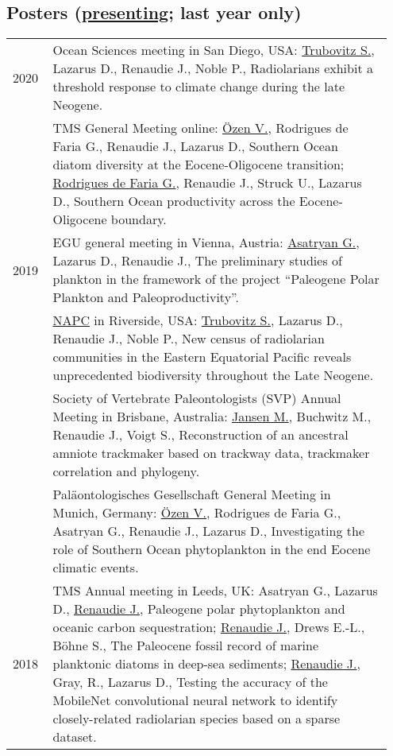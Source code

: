 \documentclass[11pt, a4paper]{article}
\begin{document}
\subsection[Posters]{Posters \textnormal{\footnotesize{(\underline{presenting}; last year only)}}}
\begin{longtable}{@{}p{0.1\linewidth} P{0.85\linewidth}@{}}
2020 & Ocean Sciences meeting in San Diego, USA: \underline{Trubovitz S.}, Lazarus D., Renaudie J., Noble P., Radiolarians exhibit a threshold response to climate change during the late Neogene.\\
 & TMS General Meeting online: \underline{\"{O}zen V.}, Rodrigues de Faria G., Renaudie J., Lazarus D., Southern Ocean diatom diversity at the Eocene-Oligocene transition; \underline{Rodrigues de Faria G.}, Renaudie J., Struck U., Lazarus D., Southern Ocean productivity across the Eocene-Oligocene boundary.\\
2019 & EGU general meeting in Vienna, Austria: \underline{Asatryan G.}, Lazarus D., Renaudie J., The preliminary studies of plankton in the framework of the project ``Paleogene Polar Plankton and Paleoproductivity''.\\
& \href{https://escholarship.org/uc/item/6r18f8wn}{NAPC} in Riverside, USA: \underline{Trubovitz S.}, Lazarus D., Renaudie J., Noble P., New census of radiolarian communities in the Eastern Equatorial Pacific reveals unprecedented biodiversity throughout the Late Neogene.\\
& Society of Vertebrate Paleontologists (SVP) Annual Meeting in Brisbane, Australia: \underline{Jansen M.}, Buchwitz M., Renaudie J., Voigt S., Reconstruction of an ancestral amniote trackmaker based on trackway data, trackmaker correlation and phylogeny.\\
& Paläontologisches Gesellschaft General Meeting in Munich, Germany: \underline{\"{O}zen V.}, Rodrigues de Faria G., Asatryan G., Renaudie J., Lazarus D., Investigating the role of Southern Ocean phytoplankton in the end Eocene climatic events.\\
2018 & TMS Annual meeting in Leeds, UK: Asatryan G., Lazarus D., \underline{Renaudie J.}, Paleogene polar phytoplankton and oceanic carbon sequestration; \underline{Renaudie J.}, Drews E.-L., Böhne S., The Paleocene fossil record of marine planktonic diatoms in deep-sea sediments; \underline{Renaudie J.}, Gray, R., Lazarus D., Testing the accuracy of the MobileNet convolutional neural network to identify closely-related radiolarian species based on a sparse dataset.\\

\end{longtable}
\end{document}

